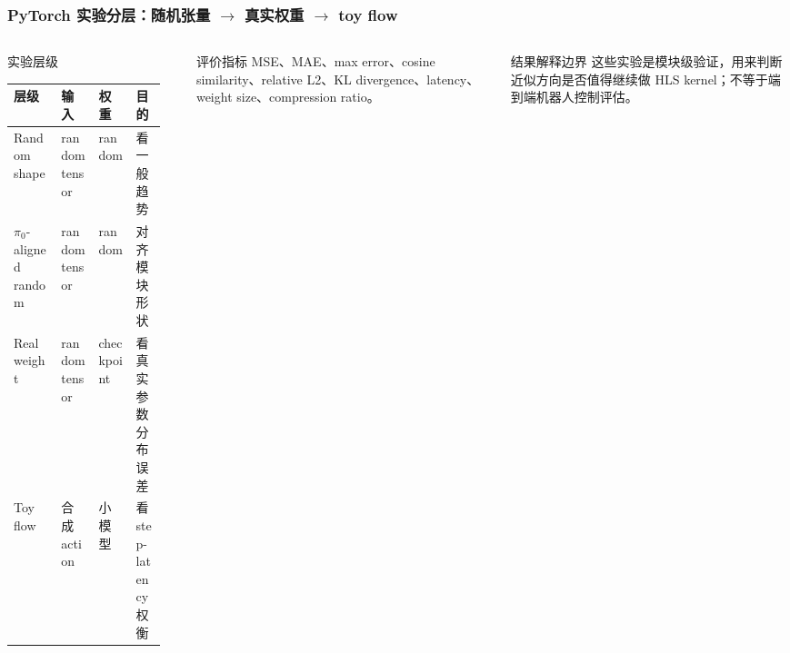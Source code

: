 \documentclass[10pt, aspectratio=169]{beamer}
\newcommand{\piZero}{\texorpdfstring{$\pi_0$}{pi0}\xspace}
\newcommand{\ra}{\ensuremath{\rightarrow}\xspace}
\begin{document}
\begin{frame}
  \frametitle{PyTorch 实验分层：随机张量 \ra 真实权重 \ra toy flow}
  \small
  \begin{columns}[T,onlytextwidth]
    \begin{block}{实验层级}
      \scriptsize
      \setlength{\tabcolsep}{3pt}
      \begin{tabular}{@{}p{0.28\linewidth}p{0.22\linewidth}p{0.22\linewidth}p{0.18\linewidth}@{}}
        \toprule
        层级           & 输入            & 权重         & 目的        \\
        \midrule
        Random shape & random tensor & random     & 看一般趋势       \\
        \piZero-aligned random & random tensor & random & 对齐模块形状 \\
        Real weight  & random tensor & checkpoint & 看真实参数分布误差       \\
        Toy flow     & 合成 action     & 小模型        & 看 step-latency 权衡 \\
        \bottomrule
      \end{tabular}
    \end{block}

    \begin{exampleblock}{评价指标}
      \footnotesize
      MSE、MAE、max error、cosine similarity、relative L2、KL divergence、latency、weight size、compression ratio。
    \end{exampleblock}

    \begin{alertblock}{结果解释边界}
      \footnotesize
      这些实验是模块级验证，用来判断近似方向是否值得继续做 HLS kernel；不等于端到端机器人控制评估。
    \end{alertblock}
  \end{columns}
\end{frame}
\end{document}
